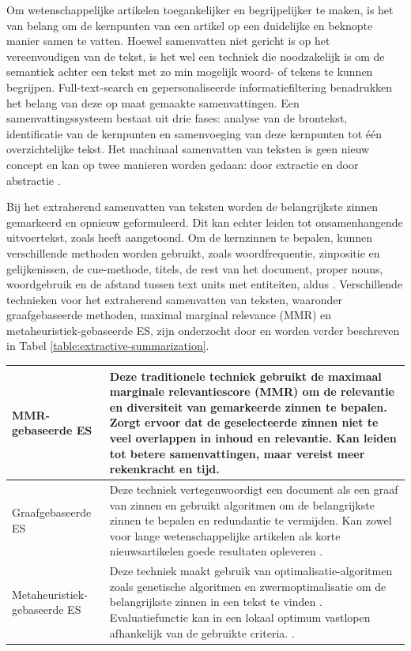 \medspace

Om wetenschappelijke artikelen toegankelijker en begrijpelijker te maken, is het van belang om de kernpunten van een artikel op een duidelijke en beknopte manier samen te vatten. Hoewel samenvatten niet gericht is op het vereenvoudigen van de tekst, is het wel een techniek die noodzakelijk is om de semantiek achter een tekst met zo min mogelijk woord- of tekens te kunnen begrijpen. Full-text-search en gepersonaliseerde informatiefiltering benadrukken het belang van deze op maat gemaakte samenvattingen. Een samenvattingssysteem bestaat uit drie fases: analyse van de brontekst, identificatie van de kernpunten en samenvoeging van deze kernpunten tot één overzichtelijke tekst. Het machinaal samenvatten van teksten is geen nieuw concept en kan op twee manieren worden gedaan: door extractie en door abstractie \autocite{Hahn2000, Dubay2004}.

\medspace

Bij het extraherend samenvatten van teksten worden de belangrijkste zinnen gemarkeerd en opnieuw geformuleerd. Dit kan echter leiden tot onsamenhangende uitvoertekst, zoals \textcite{Khan2014} heeft aangetoond. Om de kernzinnen te bepalen, kunnen verschillende methoden worden gebruikt, zoals woordfrequentie, zinpositie en gelijkenissen, de cue-methode, titels, de rest van het document, proper nouns, woordgebruik en de afstand tussen text units met entiteiten, aldus \textcite{Khan2014}. Verschillende technieken voor het extraherend samenvatten van teksten, waaronder graafgebaseerde methoden, maximal marginal relevance (MMR) en metaheuristiek-gebaseerde ES, zijn onderzocht door \textcite{Verma2020} en worden verder beschreven in Tabel \ref{table:extractive-summarization}.

\begin{center}
	\begin{tabular}{ | m{4cm} | m{12cm} | } 
		\hline
		MMR-gebaseerde ES & Deze traditionele techniek gebruikt de maximaal marginale relevantiescore (MMR) om de relevantie en diversiteit van gemarkeerde zinnen te bepalen. Zorgt ervoor dat de geselecteerde zinnen niet te veel overlappen in inhoud en relevantie. Kan leiden tot betere samenvattingen, maar vereist meer rekenkracht en tijd. \\
		\hline
		Graafgebaseerde ES & Deze techniek vertegenwoordigt een document als een graaf van zinnen en gebruikt algoritmen om de belangrijkste zinnen te bepalen en redundantie te vermijden. Kan zowel voor lange wetenschappelijke artikelen als korte nieuwsartikelen goede resultaten opleveren \autocite{McDonald2007, Lin2010}. \\ 
		\hline
		Metaheuristiek-gebaseerde ES & Deze techniek maakt gebruik van optimalisatie-algoritmen zoals genetische algoritmen en zwermoptimalisatie om de belangrijkste zinnen in een tekst te vinden \autocite{Premjith2015, Verma2020}. Evaluatiefunctie kan in een lokaal optimum vastlopen afhankelijk van de gebruikte criteria. \autocite{Rani2021}. \\
		\hline
	\end{tabular}
	\label{table:extractive-summarization}
\end{center}

